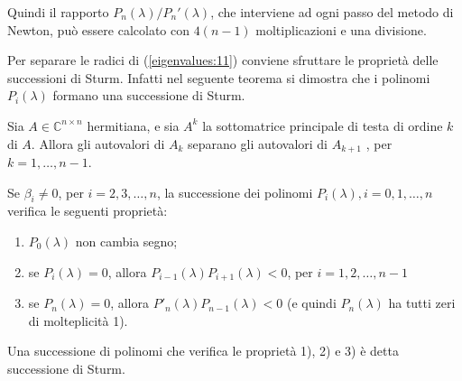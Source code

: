 Quindi il rapporto $P_n(\lambda)/P_n'(\lambda)$, che interviene ad
ogni passo del metodo di Newton, pu\`o essere calcolato con $4(n − 1)$
moltiplicazioni e una divisione.

Per separare le radici di (\ref{eigenvalues:11}) conviene sfruttare le
propriet\`a delle successioni di Sturm. Infatti nel seguente teorema
si dimostra che i polinomi $P_i(\lambda)$ formano una successione di
Sturm.

\begin{theo}
\label{eigenvalues:12}
Sia $A \in \mathbb{C}^{n \times n}$  hermitiana, e sia $A^k$ la
sottomatrice principale di testa di ordine $k$ di $A$.
Allora gli autovalori di $A_k$ separano gli autovalori di $A_{k+1}$ ,
per $k = 1, \ldots, n - 1$.
\end{theo}


\begin{theo}
\label{eigenvalues:13}
Se $\beta_i \neq 0$, per $i = 2, 3, \ldots , n$,
 la successione dei polinomi
$P_i (\lambda), i = 0, 1, \ldots, n$ verifica le seguenti propriet\`a:
\begin{enumerate}
\item  $P_0 (\lambda)$ non cambia segno;
\item se $P_i (\lambda) = 0$, allora $P_{i−1}(\lambda)P_{i+1}
(\lambda) < 0$, per $i = 1, 2, \ldots, n - 1$
\item se $P_n(\lambda) = 0$, allora $P'_n(\lambda)P_{n−1} (\lambda) < 0$
 (e quindi $P_n (\lambda)$ ha tutti zeri di molteplicit\`a 1).

\end{enumerate}
Una successione di polinomi che verifica le propriet\`a
1), 2) e 3) \`e detta successione di Sturm.
\end{theo}
